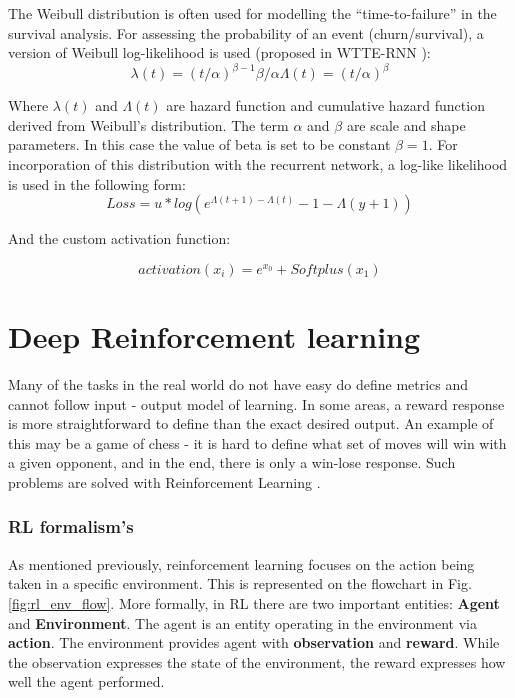 The Weibull distribution is often used for modelling the ``time-to-failure'' in the survival analysis.
For assessing the probability of an event (churn/survival), a version of Weibull log-likelihood is used (proposed in WTTE-RNN \cite{martinsson:Thesis:2016}):
\begin{equation}
    \lambda(t) = (t/\alpha)^{\beta-1}\beta/\alpha
\Lambda(t) = (t/\alpha)^{\beta}
\end{equation}


Where $\lambda(t)$ and $\Lambda(t)$ are hazard function and cumulative hazard function derived from Weibull's distribution.
The term $\alpha$ and $\beta$ are scale and shape parameters. In this case the value of beta is set to be constant $\beta = 1$.
For incorporation of this distribution with the recurrent network, a log-like likelihood is used in the following form:
$$
Loss = u * log(e^{\Lambda(t+1)-\Lambda(t)}-1 - \Lambda(y+1))
$$

And the custom activation function:

\begin{equation}
    activation(x_{i}) = e^{x_{0}} + Softplus(x_{1})
    \label{math:acti}
\end{equation}

\section{Deep Reinforcement learning}

Many of the tasks in the real world do not have easy do define metrics and cannot follow input - output model of learning.
In some areas, a reward response is more straightforward to define than the exact desired output.
An example of this may be a game of chess - it is hard to define what set of moves will win with a given opponent, and in the end, there is only a win-lose response.
Such problems are solved with Reinforcement Learning \cite{Lapan18}.

\subsubsection{RL formalism's}
\label{sec:rl_mdp}

As mentioned previously, reinforcement learning focuses on the action being taken in a specific environment.
This is represented on the flowchart in Fig. \ref{fig:rl_env_flow}.
More formally, in RL there are two important entities: \textbf{Agent} and \textbf{Environment}.
The agent is an entity operating in the environment via \textbf{action}.
The environment provides agent with \textbf{observation} and \textbf{reward}.
While the observation expresses the state of the environment, the reward expresses how well the agent performed.


